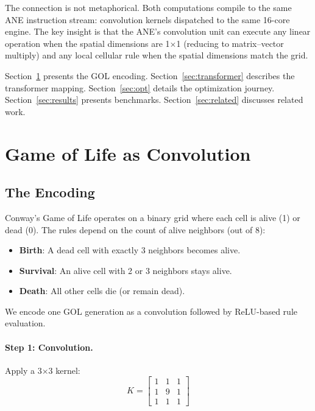 \documentclass[11pt,twocolumn]{article}
\begin{document}
The connection is not metaphorical. Both computations compile to the
same ANE instruction stream: convolution kernels dispatched to the
same 16-core engine. The key insight is that the ANE's convolution
unit can execute any linear operation when the spatial dimensions are
1$\times$1 (reducing to matrix--vector multiply) and any local
cellular rule when the spatial dimensions match the grid.

Section~\ref{sec:gol} presents the GOL encoding.
Section~\ref{sec:transformer} describes the transformer mapping.
Section~\ref{sec:opt} details the optimization journey.
Section~\ref{sec:results} presents benchmarks.
Section~\ref{sec:related} discusses related work.

\section{Game of Life as Convolution}
\label{sec:gol}

\subsection{The Encoding}

Conway's Game of Life operates on a binary grid where each cell is
alive (1) or dead (0). The rules depend on the count of alive
neighbors (out of 8):

\begin{itemize}
\item \textbf{Birth}: A dead cell with exactly 3 neighbors becomes alive.
\item \textbf{Survival}: An alive cell with 2 or 3 neighbors stays alive.
\item \textbf{Death}: All other cells die (or remain dead).
\end{itemize}

We encode one GOL generation as a convolution followed by ReLU-based
rule evaluation.

\paragraph{Step 1: Convolution.} Apply a 3$\times$3 kernel:
\begin{equation}
K = \begin{bmatrix} 1 & 1 & 1 \\ 1 & 9 & 1 \\ 1 & 1 & 1 \end{bmatrix}
\label{eq:kernel}
\end{equation}
\end{document}
